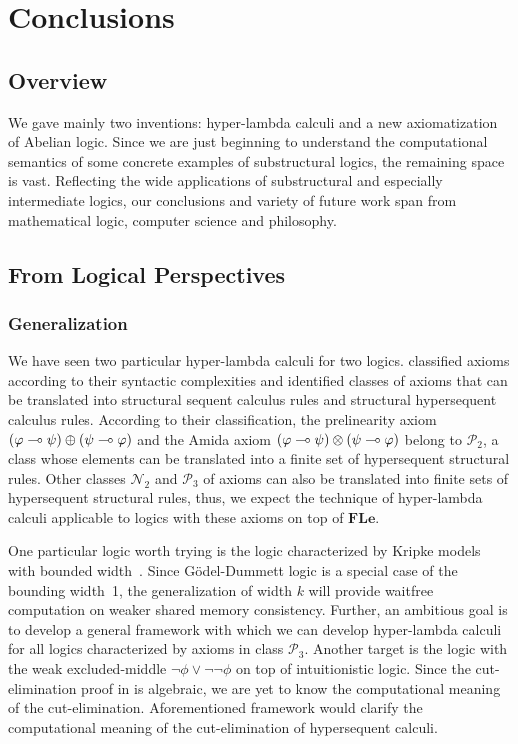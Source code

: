 \chapter{Conclusions}

\section{Overview}

We gave mainly two inventions: hyper-lambda calculi and a new
axiomatization of Abelian logic.
Since we are just beginning to understand the computational semantics of
some concrete examples of substructural logics, the remaining space is
vast.
Reflecting the wide applications of substructural and especially
intermediate logics,
our conclusions and variety of future work span from mathematical logic, computer
science and philosophy.

\section{From Logical Perspectives}

\subsection{Generalization}

We have seen two particular hyper-lambda calculi for two logics.
\citet{alg} classified axioms according to their syntactic complexities
and identified classes of axioms that can be translated into structural
sequent calculus rules and structural hypersequent calculus rules.
According to their classification, the prelinearity axiom
$(\varphi\multimap\psi)\oplus(\psi\multimap\varphi)$ and the Amida axiom
$(\varphi\multimap\psi)\otimes(\psi\multimap\varphi)$ belong to $\mathcal P_2$, a
class whose elements can be translated into a finite set of
hypersequent structural rules.
Other classes $\mathcal N_2$ and $\mathcal P_3$ of axioms can also be
translated into finite sets of hypersequent structural rules,
thus, we expect the technique of hyper-lambda calculi applicable to
logics with these axioms on top of $\mathbf{FLe}$.

One particular logic worth trying is
the logic characterized by Kripke models with bounded width~\citep{Ciabattoni01042001}.
Since G\"odel-Dummett logic is a special case of the bounding width~1,
the generalization of width $k$ will provide waitfree computation on
weaker shared memory consistency.  Further,
an ambitious goal is to develop a general framework with which we can
develop hyper-lambda calculi for all logics characterized by axioms in
class $\mathcal P_3$.
Another target is the logic with the weak excluded-middle $\neg \phi\lor
\neg\neg \phi$ on top of intuitionistic logic.
Since the cut-elimination proof in \citep{alg} is algebraic,
we are yet to know the computational meaning of the cut-elimination.
Aforementioned framework would clarify the computational meaning of the
cut-elimination of hypersequent calculi.

